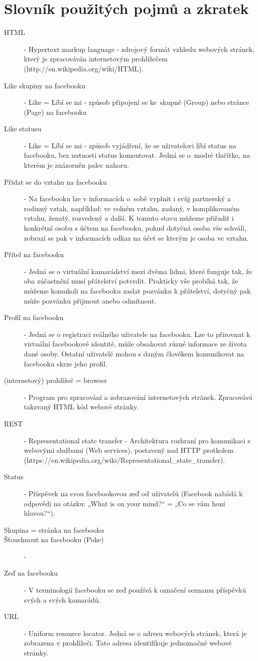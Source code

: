 \documentclass[thesis=M,czech]{FITthesis}[2013/05/10]
\begin{document}
\chapter{Slovník použitých pojmů a zkratek}
\begin{description}
	\item[HTML] - Hypertext markup language - zdrojový formát vzhledu webových stránek, který je zpracováván internetovým prohlížečem
		\newline(http://en.wikipedia.org/wiki/HTML).
	\item[Like skupiny na facebooku] - Like = Líbí se mi - způsob připojení se ke~skupně (Group) nebo stránce (Page) na facebooku
	\item[Like statusu] - Like = Líbí se mi - způsob vyjádření, že se uživatelovi líbí status na facebooku, bez nutnosti status komentovat. Jedná se o~modré tlačítko, na kterém je znázorněn palec nahoru.
	\item[Přidat se do vztahu na facebooku] - Na facebooku lze v informacích o~sobě vyplnit i svůj partnerský a rodinný vztah, například: ve volném vztahu, zadaný, v komplikovaném vztahu, ženatý, rozvedený a další. K tomuto stavu můžeme přiřadit i konkrétní osobu s účtem na facebooku, pokud dotyčná osoba vše schválí, zobrazí se pak v informacích odkaz na účet se kterým je osoba ve vztahu.
	\item[Přítel na facebooku] - Jedná se o virtuální kamarádství mezi dvěma lidmi, které funguje tak, že oba zúčastnění musí přátelství potvrdit. Prakticky vše probíhá tak, že můžeme komukoli na facebooku zaslat pozvánku k přátelství, dotyčný pak může pozvánku přijmout anebo odmítnout.  
	\item[Profil na facebooku] - Jedná se o registraci reálného uživatele na facebooku. Lze to přirovnat k virtuální facebookové identitě, může obsahovat různé informace ze života dané osoby. Ostatní uživatelé mohou s daným člověkem komunikovat na facebooku skrze jeho profil.
	\item[(internetový) prohlížeč = browser] - Program pro zpracování a zobrazování internetových stránek. Zpracovává takzvaný HTML kód webové stránky.
	\item[REST] - Representational state transfer - Architektura rozhraní pro komunikaci s webovými službami (Web services), postavený nad HTTP protkolem
\newline(https://en.wikipedia.org/wiki/Representational\_state\_transfer).
	\item[Status] - Příspěvek na svou facebookovou zeď od uživatelů (Facebook nabádá k odpovědi na otázku: „What is on your mind?“ = „Co se vám honí hlavou?“).
	\item[Skupina = stránka na facebooku]
	\item[Šťouchnout na facebooku (Poke)] -
	\item[Zeď na facebooku] - V terminologii facebooku se zeď používá k označení seznamu příspěvků svých a svých kamarádů.
	\item[URL] - Uniform resource locator. Jedná se o adresu webových stránek, která je zobrazena v prohlížeči. Tato adresa identifikuje jednoznačně webové stránky. 
\end{description}
\end{document}
